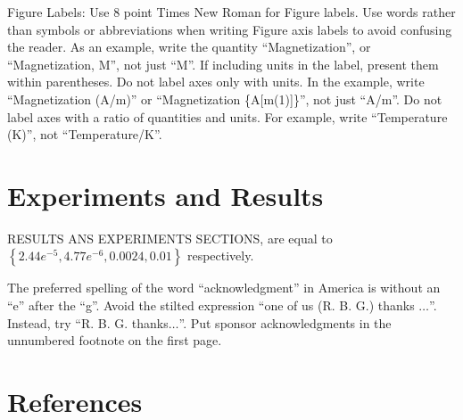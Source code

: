 \documentclass[conference]{IEEEtran}
\begin{document}


Figure Labels: Use 8 point Times New Roman for Figure labels. Use words 
rather than symbols or abbreviations when writing Figure axis labels to 
avoid confusing the reader. As an example, write the quantity 
``Magnetization'', or ``Magnetization, M'', not just ``M''. If including 
units in the label, present them within parentheses. Do not label axes only 
with units. In the example, write ``Magnetization (A/m)'' or ``Magnetization 
\{A[m(1)]\}'', not just ``A/m''. Do not label axes with a ratio of 
quantities and units. For example, write ``Temperature (K)'', not 
``Temperature/K''.

\section{Experiments and Results}

RESULTS ANS EXPERIMENTS SECTIONS, are equal to $\left\lbrace 2.44e^{-5},  4.77e^{-6}, 0.0024, 0.01  \right\rbrace$ respectively. 



The preferred spelling of the word ``acknowledgment'' in America is without 
an ``e'' after the ``g''. Avoid the stilted expression ``one of us (R. B. 
G.) thanks $\ldots$''. Instead, try ``R. B. G. thanks$\ldots$''. Put sponsor 
acknowledgments in the unnumbered footnote on the first page.\cite{larsen2016online}

\section{References}


\end{document}
